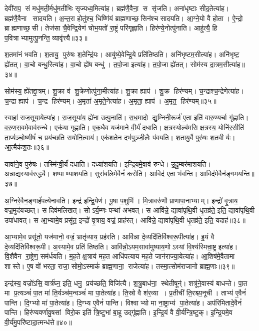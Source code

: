 देवी॑राप॒ सं मधु॑मती॒र्मधु॑मतीभिः सृज्यध्व॒मित्या॑ह।
ब्रह्म॑णै॒वैना॒ स सृ॑जति।
अना॑धृष्टाः सीद॒तेत्या॑ह।
ब्रह्म॑णै॒वैना सादयति।
अ॒न्त॒रा होतु॑श्च॒ धिष्णि॑यं ब्राह्मणाच्छ॒सिन॑श्च सादयति।
आ॒ग्ने॒यो वै होता।
ऐ॒न्द्रो ब्राह्मणाच्छ॒सी।
तेज॑सा चै॒वेन्द्रि॒येण॑ चोभ॒यतो॑ रा॒ष्ट्रं परि॑गृह्णाति।
हिर॑ण्ये॒नोत्पु॑नाति।
आहु॑त्यै॒ हि प॒वित्राभ्यामुत्पु॒नन्ति॒ व्यावृ॑त्त्यै॥३३॥

श॒तमा॑नं भवति।
श॒तायु॒ पुरु॑षः श॒तेन्द्रि॑यः।
आयु॑ष्ये॒वेन्द्रि॒ये प्रति॑तिष्ठति।
अनि॑भृष्टम॒सीत्या॑ह।
अनि॑भृष्ट॒ ह्ये॑तत्।
वा॒चो बन्धु॒रित्या॑ह।
वा॒चो ह्ये॑ष बन्धु॑।
त॒पो॒जा इत्या॑ह।
त॒पो॒जा ह्ये॑तत्।
सोम॑स्य दा॒त्रम॒सीत्या॑ह॥३४॥

सोम॑स्य॒ ह्ये॑तद्दा॒त्रम्।
शु॒क्रा व॑ शु॒क्रेणोत्पु॑ना॒मीत्या॑ह।
शु॒क्रा ह्याप॑।
शु॒क्र हिर॑ण्यम्।
च॒न्द्राश्च॒न्द्रेणेत्या॑ह।
च॒न्द्रा ह्याप॑।
च॒न्द्र हिर॑ण्यम्।
अ॒मृता॑ अ॒मृते॒नेत्या॑ह।
अ॒मृता॒ ह्याप॑।
अ॒मृत॒ हिर॑ण्यम्॥३५॥

स्वाहा॑ राज॒सूया॒येत्या॑ह।
रा॒ज॒सूया॑य॒ ह्ये॑ना उत्पु॒नाति॑।
स॒ध॒मादो द्यु॒म्निनी॒रूर्ज॑ ए॒ता इति॑ वारु॒ण्यर्चा गृ॑ह्णाति।
व॒रु॒ण॒स॒वमे॒वाव॑रुन्धे।
एक॑या गृह्णाति।
ए॒क॒धैव यज॑माने वी॒र्यं॑ दधाति।
क्ष॒त्रस्योल्ब॑मसि क्ष॒त्रस्य॒ योनि॑र॒सीति॑ ता॒र्प्यञ्चो॒ष्णीषं॑ च॒ प्रय॑च्छति सयोनि॒त्वाय॑।
एक॑शतेन दर्भपुञ्जी॒लैः प॑वयति।
श॒तायु॒र्वै पुरु॑षः श॒तवीर्यः।
आ॒त्मैक॑श॒तः॥३६॥

यावा॑ने॒व पुरु॑षः।
तस्मि॑न्वी॒र्यं॑ दधाति।
दध्या॑शयति।
इ॒न्द्रि॒यमे॒वाव॑ रुन्धे।
उ॒दु॒म्बर॑माशयति।
अ॒न्नाद्य॒स्याव॑रुद्ध्यै।
शष्पाण्याशयति।
सुरा॑बलिमे॒वैनं॑ करोति।
आ॒विद॑ ए॒ता भ॑वन्ति।
आ॒विद॑मे॒वैन॑ङ्गमयन्ति॥३७॥

अ॒ग्निरे॒वैन॒ङ्गार्\mbox{}ह॑पत्येनावति।
इन्द्र॑ इन्द्रि॒येण॑।
पू॒षा प॒शुभि॑।
मि॒त्रावरु॑णौ प्राणापा॒नाभ्याम्।
इन्द्रो॑ वृ॒त्राय॒ वज्र॒मुद॑यच्छत्।
स दिव॑मलिखत्।
सोऽर्य॒म्णः पन्था॑ अभवत्।
स आवि॑न्ने॒ द्यावा॑पृथि॒वी धृ॒तव्र॑ते॒ इति॒ द्यावा॑पृथि॒वी उपा॑धावत्।
स आ॒भ्यामे॒व प्रसू॑त॒ इन्द्रो॑ वृ॒त्राय॒ वज्रं॒ प्राह॑रत्।
आवि॑न्ने॒ द्यावा॑पृथि॒वी धृ॒तव्र॑ते॒ इति॒ यदाह॑॥३८॥

आ॒भ्यामे॒व प्रसू॑तो॒ यज॑मानो॒ वज्रं॒ भ्रातृ॑व्याय॒ प्रह॑रति।
आवि॑न्ना दे॒व्यदि॑तिर्विश्वरू॒पीत्या॑ह।
इ॒यं वै दे॒व्यदि॑तिर्विश्वरू॒पी।
अ॒स्यामे॒व प्रति॑ तिष्ठति।
आवि॑न्नो॒ऽयम॒सावा॑मुष्याय॒णोऽस्यां वि॒श्य॑स्मिन्रा॒ष्ट्र इत्या॑ह।
वि॒शैवैन रा॒ष्ट्रेण॒ सम॑र्धयति।
म॒ह॒ते क्ष॒त्राय॑ मह॒त आधि॑पत्याय मह॒ते जान॑राज्या॒येत्या॑ह।
आ॒शिष॑मे॒वैतामा शास्ते।
ए॒ष वो॑ भरता॒ राजा॒ सोमो॒ऽस्माकं॑ ब्राह्म॒णाना॒ राजेत्या॑ह।
तस्मा॒त्सोम॑राजानो ब्राह्म॒णाः॥३९॥

इन्द्र॑स्य॒ वज्रो॑ऽसि॒ वार्त्र॑घ्न॒ इति॒ धनु॒ प्रय॑च्छति॒ विजि॑त्यै।
श॒त्रु॒बाध॑ना॒ स्थेतीषून्॑।
शत्रू॑ने॒वास्य॑ बाधन्ते।
पा॒त मा प्र॒त्यञ्चं॑ पा॒त मा॑ ति॒र्यञ्च॑म॒न्वञ्चं॑ मा पा॒तेत्या॑ह।
ति॒स्रो वै श॑र॒व्या।
प्र॒तीची॑ ति॒रश्च्य॒नूची।
ताभ्य॑ ए॒वैनं॑ पान्ति।
दि॒ग्भ्यो मा॑ पा॒तेत्या॑ह।
दि॒ग्भ्य ए॒वैनं॑ पान्ति।
विश्वाभ्यो मा ना॒ष्ट्राभ्य॑ पा॒तेत्या॑ह।
अप॑रिमितादे॒वैनं॑ पान्ति।
हिर॑ण्यवर्णावु॒षसां विरो॒क इति॑ त्रि॒ष्टुभा॑ बा॒हू उद्गृ॑ह्णाति।
इ॒न्द्रि॒यं वै वी॒र्य॑न्त्रि॒ष्टुक्।
इ॒न्द्रि॒यमे॒व वी॒र्य॑मु॒परि॑ष्टादा॒त्मन्ध॑त्ते॥४०॥\anuvakamend[व्यावृ॑त्त्यै दा॒त्रम॒सीत्या॑हा॒मृत॒ हिर॑ण्यमेकश॒तो ग॑मय॒न्त्याह॑ ब्राह्म॒णा ना॒ष्ट्राभ्य॑ पा॒तेत्या॑ह च॒त्वारि॑ च]

